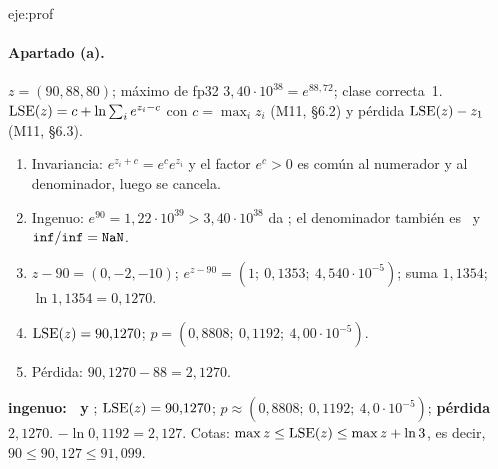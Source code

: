 \begin{solucion}{eje:prof}
\paragraph{Apartado (a).}
\datos $z=(90,88,80)$; máximo de fp32 $3{,}40\cdot 10^{38}=e^{88{,}72}$; clase correcta~1.
\planteamiento $\operatorname{LSE}(z)=c+\ln\sum_ie^{z_i-c}$ con $c=\max_iz_i$ (M11, §6.2) y pérdida $\operatorname{LSE}(z)-z_1$ (M11, §6.3).
\pasos
\begin{enumerate}[label=\arabic*.]
  \item Invariancia: $e^{z_i+c}=e^{c}e^{z_i}$ y el factor $e^{c}>0$ es común al numerador y al denominador, luego se cancela.
  \item Ingenuo: $e^{90}=1{,}22\cdot 10^{39}>3{,}40\cdot 10^{38}$ da \Inf; el denominador también es \Inf\ y $\Inf/\Inf=\NaN$.
  \item $z-90=(0,-2,-10)$; $e^{z-90}=(1;\allowbreak\ 0{,}1353;\allowbreak\ 4{,}540\cdot 10^{-5})$; suma $1{,}1354$; $\ln 1{,}1354=0{,}1270$.
  \item $\operatorname{LSE}(z)=90{,}1270$; $p=(0{,}8808;\allowbreak\ 0{,}1192;\allowbreak\ 4{,}00\cdot 10^{-5})$.
  \item Pérdida: $90{,}1270-88=2{,}1270$.
\end{enumerate}
\resultado \textbf{ingenuo: \Inf\ y \NaN}; $\operatorname{LSE}(z)=90{,}1270$; $p\approx(0{,}8808;\allowbreak\ 0{,}1192;\allowbreak\ 4{,}0\cdot 10^{-5})$; \textbf{pérdida} $2{,}1270$.
\comprobacion $-\ln 0{,}1192=2{,}127$. Cotas: $\max z\le\operatorname{LSE}(z)\le\max z+\ln 3$, es decir, $90\le 90{,}127\le 91{,}099$.


\end{solucion}
